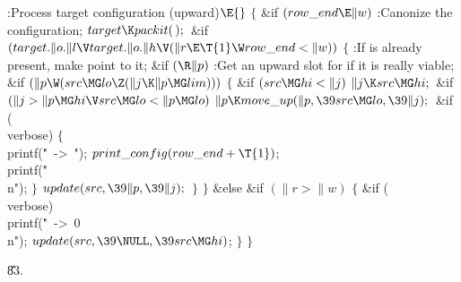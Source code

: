 \B{}:Process target configuration  (upward)\X${}\E{}$\6
${}\{{}$\1\6
\&{if} ${}(\\{row\_end}\E\|w){}$\1\5
:Canonize the configuration\X;\2\6
${}\\{target}\K\\{packit}(\,);{}$\6
\&{if} ${}(\\{target}.\|o.\|l\V\\{target}.\|o.\|h\V(\|r\E\T{1}\W\\{row\_end}<%
\|w)){}$\5
${}\{{}$\1\6
:If  is already present, make  point to it\X;\6
\&{if} ${}(\R\|p){}$\1\5
:Get an upward slot for  if it is really viable\X;\2\6
\&{if} ${}(\|p\W(\\{src}\MG\\{lo}\Z(\|j\K\|p\MG\\{lim}))){}$\5
${}\{{}$\1\6
\&{if} ${}(\\{src}\MG\\{hi}<\|j){}$\1\5
${}\|j\K\\{src}\MG\\{hi};{}$\2\6
\&{if} ${}(\|j>\|p\MG\\{hi}\V\\{src}\MG\\{lo}<\|p\MG\\{lo}){}$\1\5
${}\|p\K\\{move\_up}(\|p,\39\\{src}\MG\\{lo},\39\|j);{}$\2\6
\&{if} (\\{verbose})\5
${}\{{}$\1\6
\\{printf}(\.{"\ ->\ "});\5
${}\\{print\_config}(\\{row\_end}+\T{1}){}$;\5
\\{printf}(\.{"\\n"});\6
\4${}\}{}$\2\6
${}\\{update}(\\{src},\39\|p,\39\|j);{}$\6
\4${}\}{}$\2\6
\4${}\}{}$\5
\2\&{else} \&{if} ${}(\|r>\|w){}$\5
${}\{{}$\1\6
\&{if} (\\{verbose})\1\5
\\{printf}(\.{"\ ->\ 0\\n"});\2\6
${}\\{update}(\\{src},\39\NULL,\39\\{src}\MG\\{hi}){}$;\6
\4${}\}{}$\2\6
\4${}\}{}$\2\par
\U83.\fi

